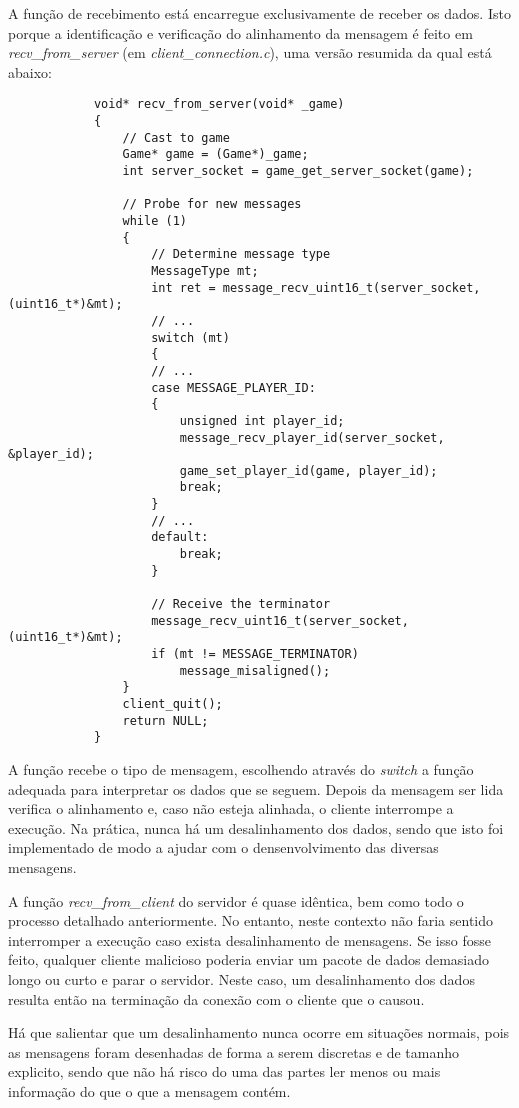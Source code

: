 \documentclass[a4paper]{report}
\begin{document}
        \par A função de recebimento está encarregue exclusivamente de receber os dados. Isto porque a identificação e verificação do alinhamento da mensagem é feito em \textit{recv\_from\_server} (em \textit{client\_connection.c}), uma versão resumida da qual está abaixo:
        \begin{lstlisting}
            void* recv_from_server(void* _game)
            {
                // Cast to game
                Game* game = (Game*)_game;
                int server_socket = game_get_server_socket(game);

                // Probe for new messages
                while (1)
                {
                    // Determine message type
                    MessageType mt;
                    int ret = message_recv_uint16_t(server_socket, (uint16_t*)&mt);
                    // ...
                    switch (mt)
                    {
                    // ...
                    case MESSAGE_PLAYER_ID:
                    {
                        unsigned int player_id;
                        message_recv_player_id(server_socket, &player_id);
                        game_set_player_id(game, player_id);
                        break;
                    }
                    // ...
                    default:
                        break;
                    }

                    // Receive the terminator
                    message_recv_uint16_t(server_socket, (uint16_t*)&mt);
                    if (mt != MESSAGE_TERMINATOR)
                        message_misaligned();
                }
                client_quit();
                return NULL;
            }
        \end{lstlisting}
        \par A função recebe o tipo de mensagem, escolhendo através do \textit{switch} a função adequada para interpretar os dados que se seguem. Depois da mensagem ser lida verifica o alinhamento e, caso não esteja alinhada, o cliente interrompe a execução. Na prática, nunca há um desalinhamento dos dados, sendo que isto foi implementado de modo a ajudar com o densenvolvimento das diversas mensagens.
        \par A função \textit{recv\_from\_client} do servidor é quase idêntica, bem como todo o processo detalhado anteriormente. No entanto, neste contexto não faria sentido interromper a execução caso exista desalinhamento de mensagens. Se isso fosse feito, qualquer cliente malicioso poderia enviar um pacote de dados demasiado longo ou curto e parar o servidor. Neste caso, um desalinhamento dos dados resulta então na terminação da conexão com o cliente que o causou. 
        \par Há que salientar que um desalinhamento nunca ocorre em situações normais, pois as mensagens foram desenhadas de forma a serem discretas e de tamanho explicito, sendo que não há risco do uma das partes ler menos ou mais informação do que o que a mensagem contém.
\end{document}
